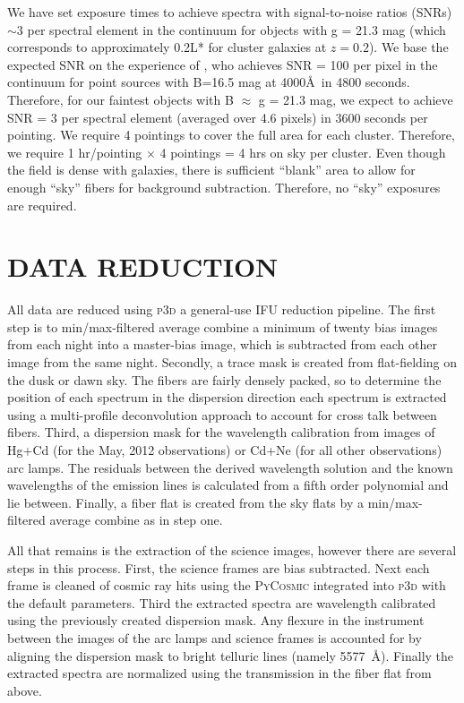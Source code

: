  We have set exposure times to achieve spectra with signal-to-noise ratios (SNRs) $\sim3$ per spectral element in the continuum for objects with g = 21.3 mag (which corresponds to approximately 0.2L* for cluster galaxies at $z = 0.2$). We base the expected SNR on the experience of \cite{Shetrone2010}, who achieves SNR = 100 per pixel in the continuum for point sources with B=16.5 mag at 4000\AA\ in 4800 seconds. Therefore, for our faintest objects with B $\approx$ g = 21.3 mag, we expect to achieve SNR = 3 per spectral element (averaged over 4.6 pixels) in 3600 seconds per pointing. We require 4 pointings to cover the full area for each cluster. Therefore, we require 1 hr/pointing $\times$ 4 pointings = 4 hrs on sky per cluster. Even though the field is dense with galaxies, there is sufficient ``blank'' area to allow for enough ``sky'' fibers for background subtraction. Therefore, no ``sky'' exposures are required. 

\section{DATA REDUCTION}\label{sec:data reduction} 
All data are reduced using \textsc{p3d} \citep{Sandin2010} a general-use IFU reduction pipeline. The first step is to min/max-filtered average combine a minimum of twenty bias images from each night into a master-bias image, which is subtracted from each other image from the same night. Secondly, a trace mask is created from flat-fielding on the dusk or dawn sky. The fibers are fairly densely packed, so to determine the position of each spectrum in the dispersion direction each spectrum is extracted using a multi-profile deconvolution approach \citep{Sharp2010} to account for cross talk between fibers. Third, a dispersion mask for the wavelength calibration from images of Hg+Cd (for the May, 2012 observations) or Cd+Ne (for all other observations) arc lamps. The residuals between the derived wavelength solution and the known wavelengths of the emission lines is calculated from a fifth order polynomial and lie between. Finally, a fiber flat is created from the sky flats by a min/max-filtered average combine as in step one. 

All that remains is the extraction of the science images, however there are several steps in this process. First, the science frames are bias subtracted. Next each frame is cleaned of cosmic ray hits using the \textsc{PyCosmic} \citep{Husemann2012} integrated into \textsc{p3d} with the default parameters. Third the extracted spectra are wavelength calibrated using the previously created dispersion mask. Any flexure in the instrument between the images of the arc lamps and science frames is accounted for by aligning the dispersion mask to bright telluric lines (namely 5577~\AA). Finally the extracted spectra are normalized using the transmission in the fiber flat from above.

